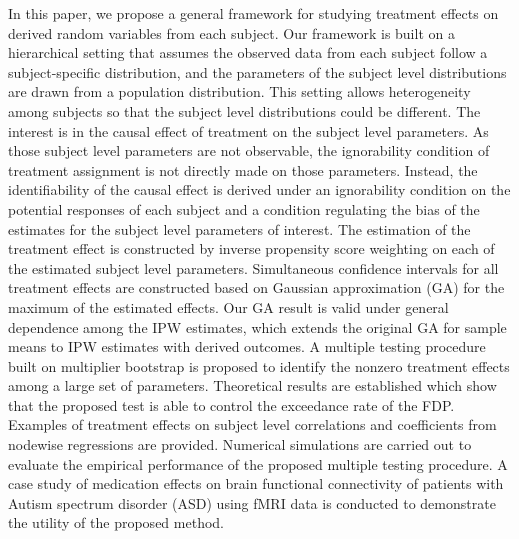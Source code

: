 \documentclass[12pt]{article}
\theoremstyle{definition}
\begin{document}
In this paper, we propose a general framework for studying treatment effects on derived random variables from each subject. Our framework is built on a hierarchical setting that assumes the observed data from each subject follow a subject-specific distribution, and the parameters of the subject level distributions are drawn from a population distribution. 
This setting allows heterogeneity among subjects so that the subject level distributions could be different. 
The interest is in the causal effect of treatment on the subject level parameters. 
As those subject level parameters are not observable, the ignorability condition of treatment assignment is not directly made on those parameters.
Instead, the identifiability of the causal effect is derived under an ignorability condition on the potential responses of each subject and a condition regulating the bias of the estimates for the subject level parameters of interest.
The estimation of the treatment effect is constructed by inverse propensity score weighting on each of the estimated subject level parameters. 
Simultaneous confidence intervals for all treatment effects are constructed based on Gaussian approximation (GA) for the maximum of the estimated effects.
Our GA result is valid under general dependence among the IPW estimates, which extends the original GA for sample means \citep{chernozhukov2013gaussian} to 
IPW estimates with derived outcomes.
A multiple testing procedure built on multiplier bootstrap is proposed to identify the nonzero treatment effects among a large set of parameters.  
Theoretical results are established which show that the proposed test is able to control the exceedance rate of the FDP.
Examples of treatment effects on subject level correlations and coefficients from nodewise regressions are provided. 
Numerical simulations are carried out to evaluate the empirical performance of the proposed multiple testing procedure. 
A case study of medication effects on brain functional connectivity of patients with Autism spectrum disorder (ASD) using fMRI data is conducted to demonstrate the utility of the proposed method. 
\end{document}
